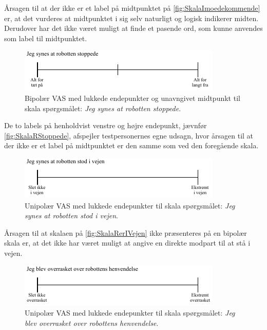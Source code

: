 Årsagen til at der ikke er et label på midtpunktet på \autoref{fig:SkalaImoedekommende} er, at det vurderes at midtpunktet i sig selv naturligt og logisk indikerer midten. Derudover har det ikke været muligt at finde et pasende ord, som kunne anvendes som label til midtpunktet.  
%
\begin{figure}[H]
\centering
\includegraphics[width =\textwidth]{Figure/UdvalgteSkalaer/RStoppede} 
\caption{Bipolær VAS med lukkede endepunkter og unavngivet midtpunkt til skala spørgsmålet: \textit{Jeg synes at robotten stoppede}.}
\label{fig:SkalaRStoppede}
\end{figure}
\noindent
%
De to labels på henholdvist venstre og højre endepunkt, jævnfør \autoref{fig:SkalaRStoppede}, afspejler testpersonernes egne udsagn, hvor årsagen til at der ikke er et label på midtpunktet er den samme som ved den foregående skala. 
%
\begin{figure}[H]
\centering
\includegraphics[width =\textwidth]{Figure/UdvalgteSkalaer/RobottenErIVejen} 
\caption{Unipolær VAS med lukkede endepunkter til skala spørgsmålet: \textit{Jeg synes at robotten stod i vejen}.}
\label{fig:SkalaRerIVejen}
\end{figure}
\noindent
%
Årsagen til at skalaen på \autoref{fig:SkalaRerIVejen} ikke præsenteres på en bipolær skala er, at det ikke har været muligt at angive en direkte modpart til at stå i vejen. 
%
\begin{figure}[H]
\centering
\includegraphics[width =\textwidth]{Figure/UdvalgteSkalaer/OverrasketOverR} 
\caption{Unipolær VAS med lukkede endepunkter til skala spørgsmålet: \textit{Jeg blev overrasket over robottens henvendelse}.}
\label{fig:SkalaOverrasketOverR}
\end{figure}
